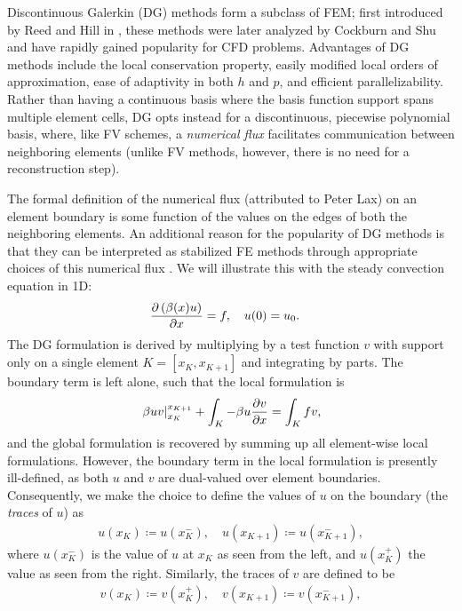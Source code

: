 Discontinuous Galerkin (DG) methods form a subclass of FEM; first introduced by Reed and Hill in \cite{Reed:73}, these methods were later analyzed by Cockburn and Shu \cite{CockburnShu:DG} and have rapidly gained popularity for CFD problems. Advantages of DG methods include the local conservation property, easily modified local orders of approximation, ease of adaptivity in both $h$ and $p$, and efficient parallelizability. Rather than having a continuous basis where the basis function support spans multiple element cells, DG opts instead for a discontinuous, piecewise polynomial basis, where, like FV schemes, a \emph{numerical flux} facilitates communication between neighboring elements (unlike FV methods, however, there is no need for a reconstruction step). 

The formal definition of the numerical flux (attributed to Peter Lax) on an element boundary is some function of the values on the edges of both the neighboring elements.  An additional reason for the popularity of DG methods is that they can be interpreted as stabilized FE methods through appropriate choices of this numerical flux \cite{Brezzi20063293}. We will illustrate this with the steady convection equation in 1D:
\begin{align*}
\pd{\left(\beta(x) u\right)}{x} = f, \quad u(0) &= u_0.
\end{align*}
The DG formulation is derived by multiplying by a test function $v$ with support only on a single element $K = [x_K,x_{K+1}]$ and integrating by parts. The boundary term is left alone, such that the local formulation is 
\[
\left.\beta u v\right|_{x_K}^{x_{K+1}} + \int_K -\beta u \pd{v}{x} = \int_K f v,
\]
and the global formulation is recovered by summing up all element-wise local formulations. However, the boundary term in the local formulation is presently ill-defined, as both $u$ and $v$ are dual-valued over element boundaries. Consequently, we make the choice to define the values of $u$ on the boundary (the \emph{traces} of $u$) as
\begin{align*}
u(x_K) \coloneqq u(x_K^-), \quad u(x_{K+1}) \coloneqq u(x_{K+1}^-),
\end{align*}
where $u(x_K^-)$ is the value of $u$ at $x_K$ as seen from the left, and $u(x_K^+)$ the value as seen from the right. Similarly, the traces of $v$ are defined to be
\begin{align*}
v(x_K) \coloneqq v(x_K^+), \quad v(x_{K+1}) \coloneqq v(x_{K+1}^-),
\end{align*}
